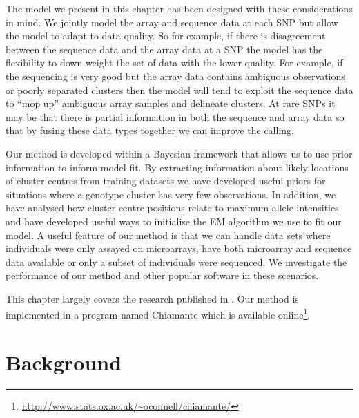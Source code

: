 The model we present in this chapter has been designed with these considerations in mind. We jointly model the array and sequence data at each SNP but allow the model to adapt to data quality. So for example, if there is disagreement between the sequence data and the array data at a SNP the model has the flexibility to down weight the set of data with the lower quality. For example, if the sequencing is very good but the array data contains ambiguous observations or poorly separated clusters then the model will tend to exploit the sequence data to ``mop up'' ambiguous array samples and delineate clusters. At rare SNPs it may be that there is partial information in both the sequence and array data so that by fusing these data types together we can improve the calling.

Our method is developed within a Bayesian framework that allows us to use prior information to inform model fit. By extracting information about likely locations of cluster centres from training datasets we have developed useful priors for situations where a genotype cluster has very few observations. In addition, we have analysed how cluster centre positions relate to maximum allele intensities and have developed useful ways to initialise the EM algorithm we use to fit our model. A useful feature of our method is that we can handle data sets where individuals were only assayed on microarrays, have both microarray and sequence data available or only a subset of individuals were sequenced. We investigate the performance of our method and other popular software in these scenarios.

This chapter largely covers the research published in \cite{oconnell2012}.  Our method is implemented in a program named Chiamante which is available online\footnote{\url{http://www.stats.ox.ac.uk/~oconnell/chiamante/}}.


\section{Background}

